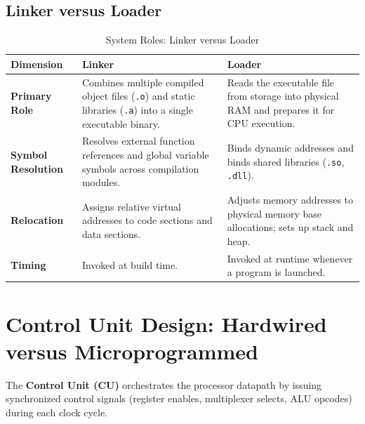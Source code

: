 \subsection{Linker versus Loader}
\begin{table}[htbp]
\centering
\small
\caption{System Roles: Linker versus Loader}
\label{tab:linker_vs_loader}
\begin{tabularx}{\textwidth}{l X X}
\toprule
\textbf{Dimension} & \textbf{Linker} & \textbf{Loader} \\
\midrule
\textbf{Primary Role} & Combines multiple compiled object files (\texttt{.o}) and static libraries (\texttt{.a}) into a single executable binary. & Reads the executable file from storage into physical RAM and prepares it for CPU execution. \\
\textbf{Symbol Resolution} & Resolves external function references and global variable symbols across compilation modules. & Binds dynamic addresses and binds shared libraries (\texttt{.so}, \texttt{.dll}). \\
\textbf{Relocation} & Assigns relative virtual addresses to code sections and data sections. & Adjusts memory addresses to physical memory base allocations; sets up stack and heap. \\
\textbf{Timing} & Invoked at build time. & Invoked at runtime whenever a program is launched. \\
\bottomrule
\end{tabularx}
\end{table}


\section{Control Unit Design: Hardwired versus Microprogrammed}
\label{sec:control_unit_design}

The \textbf{Control Unit (CU)} orchestrates the processor datapath by issuing synchronized control signals (register enables, multiplexer selects, ALU opcodes) during each clock cycle.

